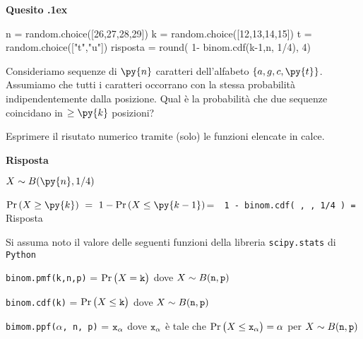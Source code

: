 \documentclass[11pt,twoside,a4paper]{article}
\newcounter{quesito}
\newenvironment{question}{\bigskip\addtocounter{quesito}{1}\bigskip\bigskip\par\textbf{Quesito \thequesito.\kern1ex}}{\vspace{\parskip}}
\newenvironment{answer}{\par\textbf{Risposta\quad}}{\vspace{\parskip}}
\begin{document}
\begin{question}
\begin{pycode}
n = random.choice([26,27,28,29])
k = random.choice([12,13,14,15])
t = random.choice(["t","u"])
risposta = round( 1- binom.cdf(k-1,n, 1/4), 4)
\end{pycode}
Consideriamo sequenze di $\py{n}$ caratteri dell'alfabeto $\{a,g,c,\py{t}\}$. Assumiamo che tutti i caratteri occorrano con la stessa probabilità indipendentemente dalla posizione. Qual è la probabilità che due sequenze coincidano in $\ge\py{k}$ posizioni?  

Esprimere il risutato numerico tramite (solo) le funzioni elencate in calce. 
\begin{answer}


$X\sim B(\py{n}, 1/4)$

$\Pr(X\ge \py{k})\ =\ 1-\Pr(X\le \py{k-1})$\quad =\ {\tt{\color{blue}  1 -  binom.cdf( , , 1/4 )} = }{\color{blue}\hfill Risposta}
\end{answer}
\end{question}



\vfill
\hrulefill

Si assuma noto il valore delle seguenti funzioni della libreria {\tt scipy.stats\/} di  {\tt Python\/}

{\tt binom.pmf(k,n,p)} = $\Pr\big(X={\tt k}\big)$ dove $X\sim B({\tt n},{\tt p})$ 

{\tt binom.cdf(k)} = $\Pr\big(X\le{\tt k}\big)$ dove  $X\sim B({\tt n},{\tt p})$ 

{\tt bimom.ppf($\alpha$, n, p)} = ${\tt x_\alpha}$ dove ${\tt x_\alpha}$ è tale che $\Pr\big(X\le{\tt x_\alpha}\big)=\alpha$ per $X\sim B({\tt n},{\tt p})$ 
\end{document}
